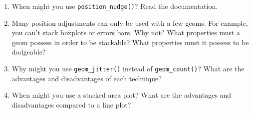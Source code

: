 \begin{enumerate}
\def\labelenumi{\arabic{enumi}.}
\item
  When might you use \texttt{position\_nudge()}? Read the documentation.
\item
  Many position adjustments can only be used with a few geoms. For
  example, you can't stack boxplots or errors bars. Why not? What
  properties must a geom possess in order to be stackable? What
  properties must it possess to be dodgeable?
\item
  Why might you use \texttt{geom\_jitter()} instead of
  \texttt{geom\_count()}? What are the advantages and disadvantages of
  each technique?
\item
  When might you use a stacked area plot? What are the advantages and
  disadvantages compared to a line plot?
\end{enumerate}
